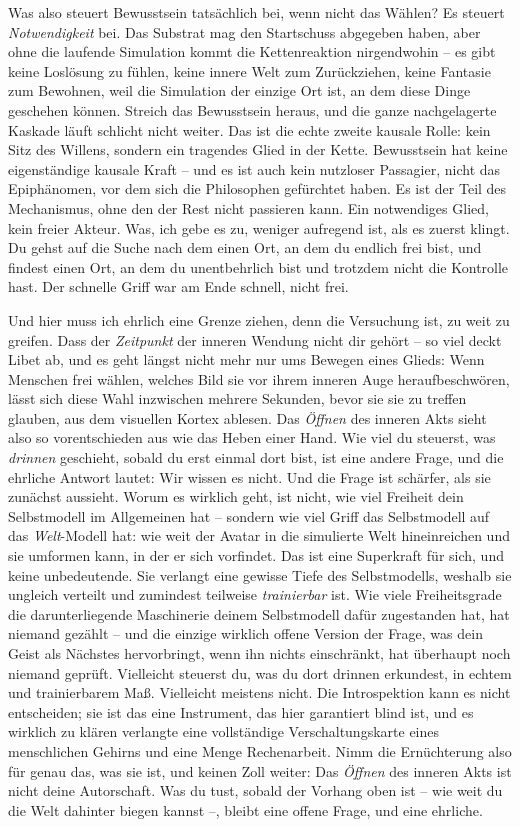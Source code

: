 \documentclass[11pt, twoside, openright]{book}
\begin{document}
Was also steuert Bewusstsein tatsächlich bei, wenn nicht das Wählen? Es steuert \textit{Notwendigkeit} bei. Das Substrat mag den Startschuss abgegeben haben, aber ohne die laufende Simulation kommt die Kettenreaktion nirgendwohin -- es gibt keine Loslösung zu fühlen, keine innere Welt zum Zurückziehen, keine Fantasie zum Bewohnen, weil die Simulation der einzige Ort ist, an dem diese Dinge geschehen können. Streich das Bewusstsein heraus, und die ganze nachgelagerte Kaskade läuft schlicht nicht weiter. Das ist die echte zweite kausale Rolle: kein Sitz des Willens, sondern ein tragendes Glied in der Kette. Bewusstsein hat keine eigenständige kausale Kraft -- und es ist auch kein nutzloser Passagier, nicht das Epiphänomen, vor dem sich die Philosophen gefürchtet haben. Es ist der Teil des Mechanismus, ohne den der Rest nicht passieren kann. Ein notwendiges Glied, kein freier Akteur. Was, ich gebe es zu, weniger aufregend ist, als es zuerst klingt. Du gehst auf die Suche nach dem einen Ort, an dem du endlich frei bist, und findest einen Ort, an dem du unentbehrlich bist und trotzdem nicht die Kontrolle hast. Der schnelle Griff war am Ende schnell, nicht frei.

Und hier muss ich ehrlich eine Grenze ziehen, denn die Versuchung ist, zu weit zu greifen. Dass der \textit{Zeitpunkt} der inneren Wendung nicht dir gehört -- so viel deckt Libet ab, und es geht längst nicht mehr nur ums Bewegen eines Glieds: Wenn Menschen frei wählen, welches Bild sie vor ihrem inneren Auge heraufbeschwören, lässt sich diese Wahl inzwischen mehrere Sekunden, bevor sie sie zu treffen glauben, aus dem visuellen Kortex ablesen. Das \textit{Öffnen} des inneren Akts sieht also so vorentschieden aus wie das Heben einer Hand. Wie viel du steuerst, was \textit{drinnen} geschieht, sobald du erst einmal dort bist, ist eine andere Frage, und die ehrliche Antwort lautet: Wir wissen es nicht. Und die Frage ist schärfer, als sie zunächst aussieht. Worum es wirklich geht, ist nicht, wie viel Freiheit dein Selbstmodell im Allgemeinen hat -- sondern wie viel Griff das Selbstmodell auf das \textit{Welt}-Modell hat: wie weit der Avatar in die simulierte Welt hineinreichen und sie umformen kann, in der er sich vorfindet. Das ist eine Superkraft für sich, und keine unbedeutende. Sie verlangt eine gewisse Tiefe des Selbstmodells, weshalb sie ungleich verteilt und zumindest teilweise \textit{trainierbar} ist. Wie viele Freiheitsgrade die darunterliegende Maschinerie deinem Selbstmodell dafür zugestanden hat, hat niemand gezählt -- und die einzige wirklich offene Version der Frage, was dein Geist als Nächstes hervorbringt, wenn ihn nichts einschränkt, hat überhaupt noch niemand geprüft. Vielleicht steuerst du, was du dort drinnen erkundest, in echtem und trainierbarem Maß. Vielleicht meistens nicht. Die Introspektion kann es nicht entscheiden; sie ist das eine Instrument, das hier garantiert blind ist, und es wirklich zu klären verlangte eine vollständige Verschaltungskarte eines menschlichen Gehirns und eine Menge Rechenarbeit. Nimm die Ernüchterung also für genau das, was sie ist, und keinen Zoll weiter: Das \textit{Öffnen} des inneren Akts ist nicht deine Autorschaft. Was du tust, sobald der Vorhang oben ist -- wie weit du die Welt dahinter biegen kannst --, bleibt eine offene Frage, und eine ehrliche.
\end{document}
